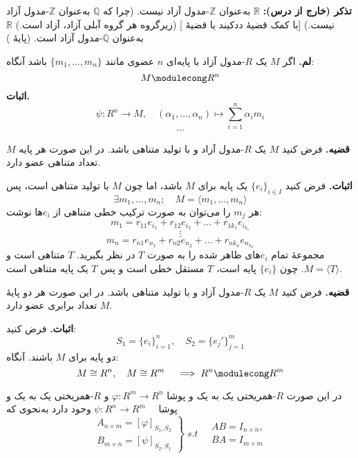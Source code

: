 \section{}







\textbf{تذکر (خارج از درس):}
$\mathbb{R}$
به‌عنوان
$\mathbb{Z}$-مدول
آزاد نیست.
(چرا که $\mathbb{Q}$ به‌عنوان $\mathbb{Z}$-مدول آزاد نیست.)
[با کمک قضیهٔ ددکیند یا قضیهٔ ]
(زیرگروه هر گروه آبلی آزاد، آزاد است.)
$\mathbb{R}$
به‌عنوان
$\mathbb{Q}$-مدول
آزاد است.
(پایهٔ )


\noindent
\textbf{لم.} اگر $M$ یک $R$-مدول آزاد با پایه‌ای $n$ عضوی مانند $\{m_1, \dots, m_n\}$ باشد آنگاه:
\[
    M \modulecong R^n
\]
\textbf{اثبات.}
\[
    \psi: R^n \to M, \quad (\alpha_1, \dots, \alpha_n) \mapsto  \sum_{i=1}^n \alpha_i m_i
\]
\[\cdots\]

\hrulefill

\noindent
\textbf{قضیه.} فرض کنید $M$ یک $R$-مدول آزاد و با تولید متناهی باشد. در این صورت هر پایه $M$ تعداد متناهی عضو دارد.

\textbf{اثبات.} فرض کنید $\{e_i\}_{i \in I}$ یک پایه برای $M$ باشد، اما چون $M$ با تولید متناهی است، پس
\[
    \exists m_1, \dots, m_n; \quad M = \langle m_1, \dots, m_n \rangle
\]
هر $m_j$ را می‌توان به صورت ترکیب خطی متناهی از $e_i$ها نوشت:
\[
    m_1 = r_{11} e_{i_1} + r_{12} e_{i_2} + \dots + r_{1k_1} e_{i_{k_1}}
\]
\[
    \vdots
\]
\[
    m_n = r_{n1} e_{n_1} + r_{n2} e_{n_2} + \dots + r_{n k_n} e_{n_{k_n}}
\]
مجموعهٔ تمام $e_i$های ظاهر شده را به صورت $T$ در نظر بگیرید. $T$ متناهی است و $M = \langle T \rangle$. چون $\{e_i\}$ پایه است، $T$ مستقل خطی است و پس $T$ یک پایه متناهی است.


\hrulefill

\textbf{قضیه.} فرض کنید $M$ یک $R$-مدول آزاد و با تولید متناهی باشد. در این صورت هر دو پایهٔ $M$ تعداد برابری عضو دارد.


\textbf{اثبات.} فرض کنید:
\[
    S_1 = \{ e_i \}_{i=1}^n, \quad S_2 = \{ e_j' \}_{j=1}^m
\]
دو پایه برای $M$ باشند. آنگاه:
\[
    M \cong R^n, \quad M \cong R^m \quad \implies  R^n \modulecong R^m
\]

در این صورت
{$R$-همریختی یک به یک و پوشا}
\( \varphi :R^m \to R^n \)
و
{$R$-همریختی یک به یک و پوشا}
\(\psi :R^n \to R^m \quad \)
وجود دارد به‌نحوی که
\[
    \left.
    \begin{aligned}
        A_{n \times m} = [\varphi]_{S_1, S_2} \\
        B_{m \times n} = [\psi]_{S_2, S_1}
    \end{aligned}
    \right\}
    \; s.t \quad
    \begin{aligned}
        AB = I_{n \times n}, \\
        BA = I_{m \times m}
    \end{aligned}
\]

